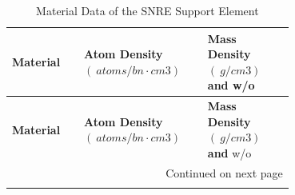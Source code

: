 \documentclass[8pt,a5paper]{article}
\begin{document}
\begin{longtable}{|m{0.2\linewidth}|m{0.25\linewidth}|m{0.25\linewidth}|}
    \caption{Material Data of the SNRE Support Element} \\
    
    \hline \textbf{Material} & \textbf{Atom Density $(\SI{}{atoms/bn \cdot cm3})$} & \textbf{Mass Density $(\SI{}{g/cm3})$ and} w/o \\ \hline 
    \endfirsthead
    
    
    \hline \textbf{Material} & \textbf{Atom Density $(\SI{}{atoms/bn \cdot cm3})$} & \textbf{Mass Density $(\SI{}{g/cm3})$ and} w/o \\ \hline 
    \endhead
    
    \hline \multicolumn{3}{|r|}{{Continued on next page}} \\ \hline
    \endfoot
    

\end{longtable}
\end{document}
